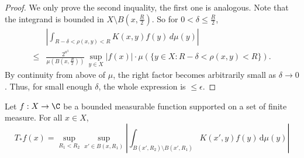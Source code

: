 \begin{proof}
We only prove the second inquality, the first one is analogous.
Note that the integrand is bounded in $X\setminus B(x,\frac{R}{2})$. So for $0<\delta\le\frac{R}{2}$,
\begin{align*}
    &\left| \int_{R-\delta<\rho(x,y)<R} K(x,y) f(y) \, d\mu(y) \right| \\
    \le &\frac{2^{a^3}}{\mu(B(x,\frac{R}{2}))} \, \sup_{y\in X}|f(x)| \cdot \mu(\{y\in X: R-\delta<\rho(x,y)<R\}).
\end{align*}
By continuity from above of $\mu$, the right factor becomes arbitrarily small as $\delta\rightarrow 0$. Thus, for small enough $\delta$, the whole expression is $\le\epsilon$.
\end{proof}

\begin{lemma}\label{tang-unm-op-ball-diff}
    Let $f:X\to\C$ be a bounded measurable function supported on a set of finite measure.
    For all $x\in X$,
    \begin{equation}
    \label{tang-unm-op-eq}
        T_*f(x) = \sup_{R_1 < R_2} \sup_{x'\in B(x,R_1)} \left|\int_{B(x',R_2)\setminus B(x',R_1)} K(x',y) f(y) \, \mathrm{d}\mu(y) \right|
    \end{equation}
\end{lemma}
